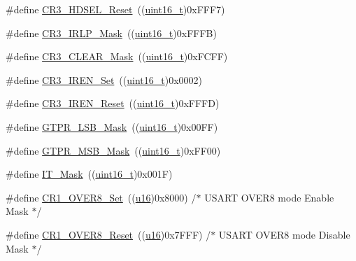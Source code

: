 \begin{DoxyCompactItemize}
\item 
\#define \hyperlink{group___u_s_a_r_t___private___defines_ga762c72448ba24f3487dfa457a8dcc9fc}{C\+R3\+\_\+\+H\+D\+S\+E\+L\+\_\+\+Reset}~((\hyperlink{_p_e___types_8h_a1f1825b69244eb3ad2c7165ddc99c956}{uint16\+\_\+t})0x\+F\+F\+F7)
\item 
\#define \hyperlink{group___u_s_a_r_t___private___defines_gaea5d8d002a34c3a587719533db2c17f9}{C\+R3\+\_\+\+I\+R\+L\+P\+\_\+\+Mask}~((\hyperlink{_p_e___types_8h_a1f1825b69244eb3ad2c7165ddc99c956}{uint16\+\_\+t})0x\+F\+F\+F\+B)
\item 
\#define \hyperlink{group___u_s_a_r_t___private___defines_ga085e8ef6bc8f5de45c5be95971715f7f}{C\+R3\+\_\+\+C\+L\+E\+A\+R\+\_\+\+Mask}~((\hyperlink{_p_e___types_8h_a1f1825b69244eb3ad2c7165ddc99c956}{uint16\+\_\+t})0x\+F\+C\+F\+F)
\item 
\#define \hyperlink{group___u_s_a_r_t___private___defines_gad5dd1d08f3836f9a3c3f3cc0c66a8b8f}{C\+R3\+\_\+\+I\+R\+E\+N\+\_\+\+Set}~((\hyperlink{_p_e___types_8h_a1f1825b69244eb3ad2c7165ddc99c956}{uint16\+\_\+t})0x0002)
\item 
\#define \hyperlink{group___u_s_a_r_t___private___defines_gad1520358de97e48fe18780e5cc5296bd}{C\+R3\+\_\+\+I\+R\+E\+N\+\_\+\+Reset}~((\hyperlink{_p_e___types_8h_a1f1825b69244eb3ad2c7165ddc99c956}{uint16\+\_\+t})0x\+F\+F\+F\+D)
\item 
\#define \hyperlink{group___u_s_a_r_t___private___defines_ga2fe593d0c308e2245bb66905930b3ebb}{G\+T\+P\+R\+\_\+\+L\+S\+B\+\_\+\+Mask}~((\hyperlink{_p_e___types_8h_a1f1825b69244eb3ad2c7165ddc99c956}{uint16\+\_\+t})0x00\+F\+F)
\item 
\#define \hyperlink{group___u_s_a_r_t___private___defines_ga405b4222892bafdf1d084de5efd24d70}{G\+T\+P\+R\+\_\+\+M\+S\+B\+\_\+\+Mask}~((\hyperlink{_p_e___types_8h_a1f1825b69244eb3ad2c7165ddc99c956}{uint16\+\_\+t})0x\+F\+F00)
\item 
\#define \hyperlink{group___u_s_a_r_t___private___defines_ga401c753d4de6ab56fcb026c91b8c8487}{I\+T\+\_\+\+Mask}~((\hyperlink{_p_e___types_8h_a1f1825b69244eb3ad2c7165ddc99c956}{uint16\+\_\+t})0x001\+F)
\item 
\#define \hyperlink{group___u_s_a_r_t___private___defines_ga11495857ca81074790c376317382140f}{C\+R1\+\_\+\+O\+V\+E\+R8\+\_\+\+Set}~((\hyperlink{agilefox_2library_2inc_2stm32f10x__type_8h_a9e6c91d77e24643b888dbd1a1a590054}{u16})0x8000)  /$\ast$ U\+S\+A\+R\+T O\+V\+E\+R8 mode Enable Mask $\ast$/
\item 
\#define \hyperlink{group___u_s_a_r_t___private___defines_gaf84165f2974000906c495b3c27dc5121}{C\+R1\+\_\+\+O\+V\+E\+R8\+\_\+\+Reset}~((\hyperlink{agilefox_2library_2inc_2stm32f10x__type_8h_a9e6c91d77e24643b888dbd1a1a590054}{u16})0x7\+F\+F\+F)  /$\ast$ U\+S\+A\+R\+T O\+V\+E\+R8 mode Disable Mask $\ast$/

\end{DoxyCompactItemize}
